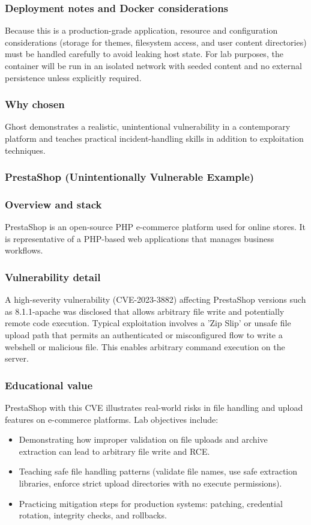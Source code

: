 \documentclass[12pt]{article}
\begin{document}
\subsubsection*{Deployment notes and Docker considerations}
Because this is a production-grade application, resource and configuration considerations (storage for themes, filesystem access, and user content directories) must be handled carefully to avoid leaking host state. For lab purposes, the container will be run in an isolated network with seeded content and no external persistence unless explicitly required.

\subsubsection*{Why chosen}
Ghost demonstrates a realistic, unintentional vulnerability in a contemporary platform and teaches practical incident-handling skills in addition to exploitation techniques.

\subsubsection{PrestaShop (Unintentionally Vulnerable Example)}

\subsubsection*{Overview and stack}
PrestaShop is an open-source PHP e-commerce platform used for online stores. It is representative of a PHP-based web applications that manages business workflows.

\subsubsection*{Vulnerability detail}	
A high-severity vulnerability (CVE-2023-3882) affecting PrestaShop versions such as 8.1.1-apache was disclosed that allows arbitrary file write and potentially remote code execution. Typical exploitation involves a 'Zip Slip' or unsafe file upload path that permits an authenticated or misconfigured flow to write a webshell or malicious file. This enables arbitrary command execution on the server.

\subsubsection*{Educational value}
PrestaShop with this CVE illustrates real-world risks in file handling and upload features on e-commerce platforms. Lab objectives include:
\begin{itemize}
    \item Demonstrating how improper validation on file uploads and archive extraction can lead to arbitrary file write and RCE.
    \item Teaching safe file handling patterns (validate file names, use safe extraction libraries, enforce strict upload directories with no execute permissions).
    \item Practicing mitigation steps for production systems: patching, credential rotation, integrity checks, and rollbacks.
\end{itemize}
\end{document}
